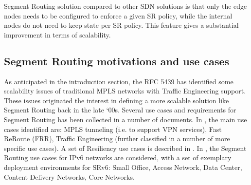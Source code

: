 Segment Routing solution compared to other SDN solutions is that only the edge nodes needs to be configured to enforce a given SR policy, while the internal nodes do not need to keep state per SR policy. This feature gives a substantial improvement in terms of scalability. 

\subsection{Segment Routing motivations and use cases}

As anticipated in the introduction section, the RFC 5439 \cite{rfc5439} has identified some scalability issues of traditional MPLS networks with Traffic Engineering support. These issues originated the interest in defining a more scalable solution like Segment Routing back in the late `00s. Several use cases and requirements for Segment Routing has been collected in a number of documents. In \cite{rfc7855}, the main use cases identified are: MPLS tunneling (i.e. to support VPN services), Fast ReRoute (FRR), Traffic Engineering (further classified in a number of more specific use cases). A set of Resiliency use cases is described in \cite{rfc8355}. In \cite{rfc8354}, the Segment Routing use cases for IPv6 networks are considered, with a set of exemplary deployment environments for SRv6: Small Office, Access Network, Data Center, Content Delivery Networks, Core Networks.

